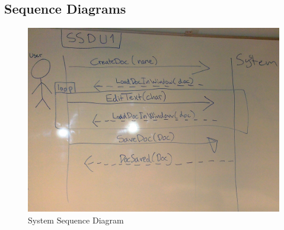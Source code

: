 \subsection{Sequence Diagrams}
\label{sequencediagrams}
\begin{figure}[H]
  \includegraphics[width=\textwidth]{illustrations/SystemStateDiagram.jpg}
  \caption{System Sequence Diagram}
  \label{systemsequencediagram}
\end{figure}
